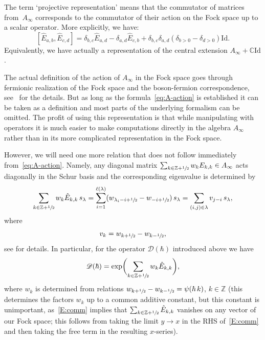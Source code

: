 \documentclass[JEP,XML,SOM,Unicode,NoEqCountersInSection,NoFloatCountersInSection]{cedram}
\let\mathcal\mathscr
\newcommand{\C}{\mathbb{C}}
\theoremstyle{plain}
\theoremstyle{definition}
\theoremstyle{remark}
\newcommand{\Z}{\mathbb{Z}}
\begin{document}
The term `projective representation' means that the commutator of matrices from~$A_\infty$ corresponds to the commutator of their action on the Fock space up to a scalar operator. More explicitly, we have:
\begin{equation}
\label{E:comm}
[\hat E_{a,b},\hat E_{c,d}] = \delta_{b,c}\hat E_{a,d} - \delta_{a,d}\hat E_{c,b}+\delta_{b,c}\delta_{a,d}(\delta_{b>0}-\delta_{d>0})\mathrm{Id}.
\end{equation}
Equivalently, we have actually a representation of the central extension $A_{\infty}+\C\mathrm{Id}$.

The actual definition of the action of $A_\infty$ in the Fock space goes through fermionic realization of the Fock space and the boson-fermion correspondence, see~\cite[\S\S5 \&~6]{MiwaJimboDate} for the details. But as long as the formula~\eqref{eq:A-action} is established it can be taken as a definition and most parts of the underlying formalism can be omitted. The profit of using this representation is that while manipulating with operators it is much easier to make computations directly in the algebra $A_\infty$ rather than in its more complicated representation in the Fock space.

However, we will need one more relation that does not follow immediately from~\eqref{eq:A-action}. Namely, any diagonal matrix $\sum_{k\in \Z+\sfrac{1}{2}}w_k E_{k,k}\in A_\infty$ acts diagonally in the Schur basis and the corresponding eigenvalue is determined by
\begin{align}\label{eq:Ewdef}
\sum_{k\in \Z+\sfrac{1}{2}}w_k \hat E_{k,k} \,s_\lambda=\sum_{i=1}^{\ell(\lambda)}(w_{\lambda_i-i+\sfrac12}-w_{-i+\sfrac12})\,s_\lambda=\sum_{(i,j)\in\lambda} v_{j-i}\,s_\lambda,
\end{align}
where
\begin{equation*}
v_k=w_{k+\sfrac12}-w_{k-\sfrac12},
\end{equation*}
see \cite{KazLand} for details. In particular, for the operator $\mathcal{D}(\hbar)$ introduced above we have
\begin{equation*}
\mathcal{D}(\hbar)=\exp\biggl(\sum_{k\in \Z+\sfrac{1}{2}}w_k \hat E_{k,k} \biggr),
\end{equation*}
where $w_k$ is determined from relations $w_{k+\sfrac12}-w_{k-\sfrac12}=\psi(\hbar\,k)$, $k\in\Z$ (this determines the factors $w_k$ up to a common additive constant, but this constant is unimportant, as~\eqref{E:comm} implies that $\sum_{k\in \Z+\sfrac{1}{2}}\hat E_{k,k}$ vanishes on any vector of our Fock space; this follows from taking the limit $y\rightarrow x$ in the RHS of~\eqref{E:comm} and then taking the free term in the resulting $x$-series).
\end{document}

